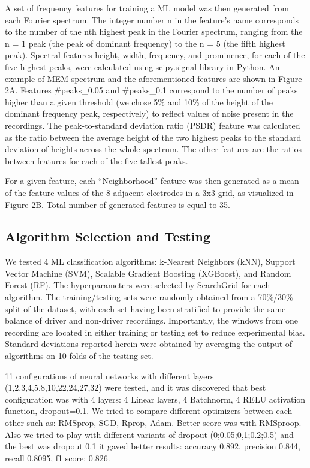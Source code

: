 \documentclass{article}
\begin{document}
A set of frequency features for training a ML model was then generated from each Fourier spectrum. The integer number n in the feature’s name corresponds to the number of the nth highest peak in the Fourier spectrum, ranging from the n = 1 peak (the peak of dominant frequency) to the n = 5 (the fifth highest peak). Spectral features height, width, frequency, and prominence, for each of the five highest peaks, were calculated using scipy.signal library in Python. An example of MEM spectrum and the aforementioned features are shown in Figure 2A. Features \#peaks\_0.05 and \#peaks\_0.1 correspond to the number of peaks higher than a given threshold (we chose 5\% and 10\% of the height of the dominant frequency peak, respectively) to reflect values of noise present in the recordings. The peak-to-standard deviation ratio (PSDR) feature was calculated as the ratio between the average height of the two highest peaks to the standard deviation of heights across the whole spectrum. The other features are the ratios between features for each of the five tallest peaks. 

For a given feature, each “Neighborhood” feature was then generated as a mean of the feature values of the 8 adjacent electrodes in a 3x3 grid, as visualized in Figure 2B. Total number of generated features is equal to 35. 

\subsection{Algorithm Selection and Testing}
We tested 4 ML classification algorithms: k-Nearest Neighbors (kNN), Support Vector Machine (SVM), Scalable Gradient Boosting (XGBoost), and Random Forest (RF). The hyperparameters were selected by SearchGrid for each algorithm. The training/testing sets were randomly obtained from a 70\%/30\% split of the dataset, with each set having been stratified to provide the same balance of driver and non-driver recordings. Importantly, the windows from one recording are located in either training or testing set to reduce experimental bias. Standard deviations reported herein were obtained by averaging the output of algorithms on 10-folds of the testing set. 

11 configurations of neural networks with different layers  (1,2,3,4,5,8,10,22,24,27,32) were tested, and it was discovered that best configuration was with 4 layers: 4 Linear layers, 4 Batchnorm,  4 RELU activation function, dropout=0.1. We tried to compare different optimizers between each other such as: RMSprop, SGD, Rprop, Adam. Better score was with RMSproop. Also we tried to play with different variants of dropout (0;0.05;0,1;0.2;0.5) and the best was dropout 0.1 it gaved better results: accuracy 0.892, precision 0.844, recall 0.8095,
f1 score: 0.826.
\end{document}
